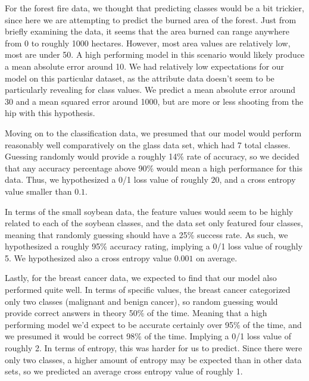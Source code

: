 \documentclass[twoside,11pt]{article}
\begin{document}
  For the forest fire data, we thought that predicting classes would be a bit trickier, since here we are attempting to predict the burned area of the forest.
  Just from briefly examining the data, it seems that the area burned can range anywhere from 0 to roughly 1000 hectares. However, most area values are relatively low,
  most are under 50. A high performing model in this scenario would likely produce a mean absolute error around 10. We had relatively low expectations for our model on
  this particular dataset, as the attribute data doesn't seem to be particularly revealing for class values. We predict a mean absolute error around 30 and a mean squared
  error around 1000, but are more or less shooting from the hip with this hypothesis. 

  Moving on to the classification data, we presumed that our model would perform reasonably well comparatively on the glass data set, which had 7 total classes. Guessing
  randomly would provide a roughly 14\% rate of accuracy, so we decided that any accuracy percentage above 90\% would mean a high performance for this data. Thus, we 
  hypothesized a 0/1 loss value of roughly $20$, and a cross entropy value smaller than $0.1$. 

  In terms of the small soybean data, the feature values would seem to be highly related to each of the soybean classes, and the data set only featured four classes,
  meaning that randomly guessing should have a 25\% success rate. As such, we hypothesized a roughly 95\% accuracy rating, implying a 0/1 loss value of roughly
  5. We hypothesized also a cross entropy value $0.001$ on average.

  Lastly, for the breast cancer data, we expected to find that our model also performed quite well. In terms of specific values, the breast cancer categorized
  only two classes (malignant and benign cancer), so random guessing would provide correct answers in theory 50\% of the time. Meaning that a high performing model
  we'd expect to be accurate certainly over 95\% of the time, and we presumed it would be correct 98\% of the time. Implying a 0/1 loss value of roughly 2. In terms of
  entropy, this was harder for us to predict. Since there were only two classes, a higher amount of entropy may be expected than in other data sets, so we predicted
  an average cross entropy value of roughly 1.
\end{document}
